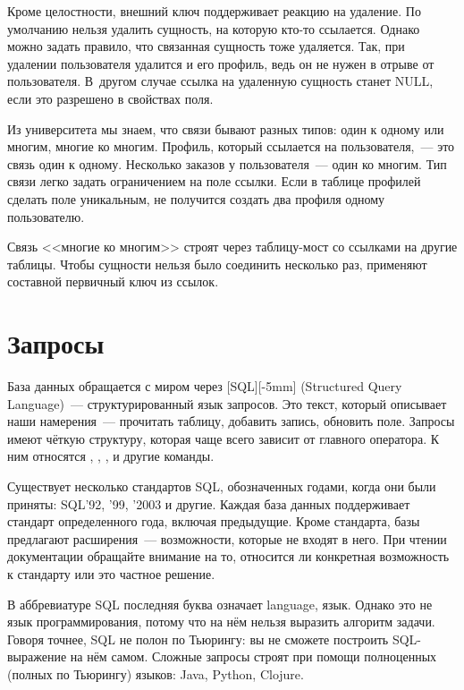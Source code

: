 Кроме целостности, внешний ключ поддерживает реакцию на удаление. По умолчанию нельзя удалить сущность, на которую кто-то ссылается. Однако можно задать правило, что связанная сущность тоже удаляется. Так, при удалении пользователя удалится и его профиль, ведь он не нужен в отрыве от пользователя. В~другом случае ссылка на удаленную сущность станет NULL, если это разрешено в свойствах поля.

Из университета мы знаем, что связи бывают разных типов: один к одному или многим, многие ко многим. Профиль, который ссылается на пользователя,~--- это связь один к одному. Несколько заказов у пользователя~--- один ко многим. Тип связи легко задать ограничением на поле ссылки. Если в таблице профилей сделать поле  уникальным, не получится создать два профиля одному пользователю.

Связь <<многие ко многим>> строят через таблицу-мост со ссылками на другие таблицы. Чтобы сущности нельзя было соединить несколько раз, применяют составной первичный ключ из ссылок.

\section{Запросы}

\def\urlsql{https://en.wikipedia.org/wiki/SQL}


База данных обращается с миром через \footurl{SQL}{\urlsql}[SQL][-5mm] (Structured Query Language)~--- структурированный язык запросов. Это текст, который описывает наши намерения~--- прочитать таблицу, добавить запись, обновить поле. Запросы имеют чёткую структуру, которая чаще всего зависит от главного оператора. К ним относятся , , ,  и другие команды.

Существует несколько стандартов SQL, обозначенных годами, когда они были приняты: SQL'92, '99, '2003 и другие. Каждая база данных поддерживает стандарт определенного года, включая предыдущие. Кроме стандарта, базы предлагают расширения~--- возможности, которые не входят в него. При чтении документации обращайте внимание на то, относится ли конкретная возможность к стандарту или это частное решение.

В аббревиатуре SQL последняя буква означает language, язык. Однако это не язык программирования, потому что на нём нельзя выразить алгоритм задачи. Говоря точнее, SQL не полон по Тьюрингу: вы не сможете построить SQL-выражение на нём самом. Сложные запросы строят при помощи полноценных (полных по Тьюрингу) языков: Java, Python, Clojure.

